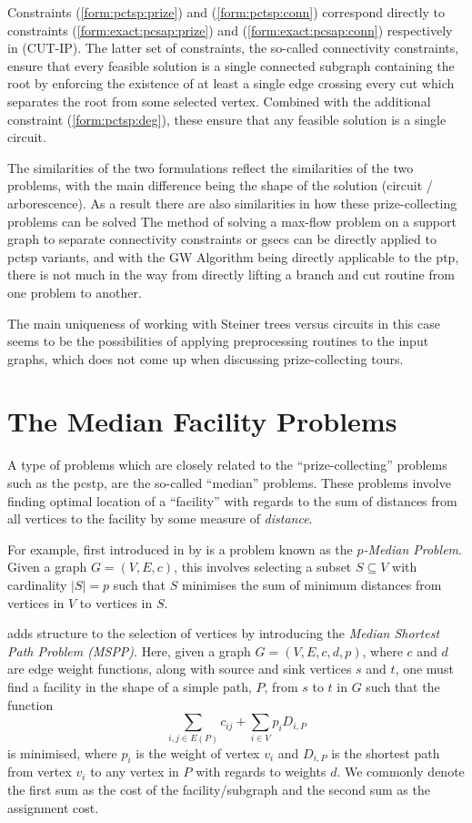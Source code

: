  Constraints (\ref{form:pctsp:prize}) and (\ref{form:pctsp:conn}) correspond directly to constraints
 (\ref{form:exact:pcsap:prize}) and (\ref{form:exact:pcsap:conn}) respectively in (CUT-IP).
 The latter set of constraints, the so-called connectivity constraints, ensure that every feasible solution
 is a single connected subgraph containing the root by enforcing the existence of at least a single edge crossing
 every cut which separates the root from some selected vertex. Combined with the
 additional constraint (\ref{form:pctsp:deg}), these ensure that any feasible solution is a single circuit.

 The similarities of the two formulations reflect the similarities of the two problems, with the main difference being
 the shape of the solution (circuit / arborescence).
 As a result there are also similarities in how these prize-collecting problems can be solved
 The method of solving a max-flow problem on a support graph
 to separate connectivity constraints or \glspl{gsec} can
 be directly applied to \gls{pctsp} variants, and with the GW Algorithm being
 directly applicable to the \gls{ptp},
 there is not much in the way from directly lifting a branch and cut routine from
 one problem to another.

 The main uniqueness of working with Steiner trees versus
 circuits in this case seems to be the possibilities of applying
 preprocessing routines to the input graphs, which does not come up
 when discussing prize-collecting tours.

 \section{The Median Facility Problems}
 \label{sec:related:median}
 A type of problems which are closely related to the
 ``prize-collecting'' problems such as the \gls{pcstp}, are the so-called
 ``median'' problems.
 These problems involve finding optimal location of a ``facility''
 with regards to the sum
 of distances from all vertices to the facility by some measure of
 \textit{distance}.

 For example, first introduced in \citeyear{hakimi1964optimum}
 by \citet{hakimi1964optimum} is a problem known as
 the \textit{$p$-Median Problem}.
 Given a graph $G = (V, E, c)$, this involves selecting a subset $S \subseteq V$ with
 cardinality $|S| = p$ such that $S$ minimises the sum of minimum distances
 from vertices in $V$ to vertices in $S$.
 
 \citet{current1987median} adds structure to the selection of vertices by introducing the \textit{Median Shortest Path Problem (MSPP)}.
 Here, given a graph $G = (V,E,c,d,p)$,
 where $c$ and $d$ are edge weight functions,
 along with source and sink vertices $s$ and $t$,
 one must find a facility
 in the shape of a simple path, $P$,
 from $s$ to $t$ in $G$
 such that the function
 \[\sum_{i,j \in E(P)} c_{ij} + \sum_{i \in V} p_i D_{i, P}\]
 is minimised,
 where $p_i$ is the weight of vertex $v_i$ and
 $D_{i, P}$ is the shortest path from vertex $v_i$ to any vertex in $P$ with regards to
 weights $d$.
 We commonly denote the first sum as the cost of the facility/subgraph and the second sum as the assignment cost.

